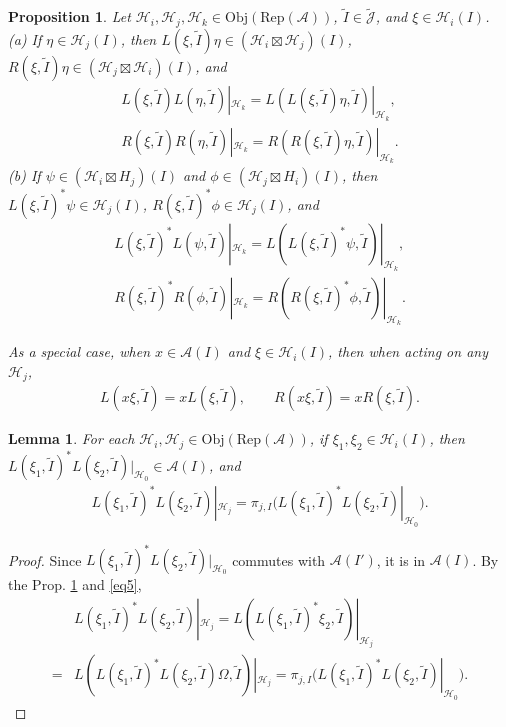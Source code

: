 \documentclass[12pt,a4paper,notitlepage]{article}
\theoremstyle{definition}
\theoremstyle{plain}
\newtheorem{pp}[df]{Proposition}
\newtheorem{lm}[df]{Lemma}
\newcommand{\mc}{\mathcal}
\newcommand{\wtd}{\widetilde}
\newcommand{\Jtd}{\widetilde{\mathcal J}}
\newcommand{\RepA}{\mathrm{Rep}(\mathcal A)}
\newcommand{\Obj}{\mathrm{Obj}}
\numberwithin{equation}{section}
\begin{document}
\begin{pp}\label{lb1}
Let $\mc H_i,\mc H_j,\mc H_k\in\Obj(\RepA)$, $\wtd I\in\Jtd$, and $\xi\in\mc H_i(I)$.\\
(a) If $\eta\in\mc H_j(I)$, then $L(\xi,\wtd I)\eta\in(\mc H_i\boxtimes\mc H_j)(I)$, $R(\xi,\wtd I)\eta\in(\mc H_j\boxtimes\mc H_i)(I)$, and
\begin{gather}
L(\xi,\wtd I)L(\eta,\wtd I)|_{\mc H_k}=L(L(\xi,\wtd I)\eta,\wtd I)|_{\mc H_k},\\
R(\xi,\wtd I)R(\eta,\wtd I)|_{\mc H_k}=R(R(\xi,\wtd I)\eta,\wtd I)|_{\mc H_k}.
\end{gather}
(b) If $\psi\in(\mc H_i\boxtimes H_j)(I)$ and $\phi\in (\mc H_j\boxtimes H_i)(I)$, then $L(\xi,\wtd I)^*\psi\in\mc H_j(I)$, $R(\xi,\wtd I)^*\phi\in\mc H_j(I)$, and
\begin{gather}
L(\xi,\wtd I)^*L(\psi,\wtd I)|_{\mc H_k}=L(L(\xi,\wtd I)^*\psi,\wtd I)|_{\mc H_k},\\
R(\xi,\wtd I)^*R(\phi,\wtd I)|_{\mc H_k}=R(R(\xi,\wtd I)^*\phi,\wtd I)|_{\mc H_k}.
\end{gather}

As a special case, when $x\in\mc A(I)$ and $\xi\in\mc H_i(I)$, then when acting on any $\mc H_j$,
\begin{align}
L(x\xi,\wtd I)=xL(\xi,\wtd I),\qquad R(x\xi,\wtd I)=xR(\xi,\wtd I).\label{eq11}	
\end{align}
\end{pp}

\begin{lm}\label{lb4}
For each $\mc H_i,\mc H_j\in\Obj(\RepA)$, if $\xi_1,\xi_2\in\mc H_i(I)$, then $L(\xi_1,\wtd I)^*L(\xi_2,\wtd I)|_{\mc H_0}\in\mc A(I)$, and
\begin{align}
L(\xi_1,\wtd I)^*L(\xi_2,\wtd I)|_{\mc H_j}=\pi_{j,I}\big(L(\xi_1,\wtd I)^*L(\xi_2,\wtd I)|_{\mc H_0}\big).	\label{eq8}
\end{align}
\end{lm}

\begin{proof}
Since $L(\xi_1,\wtd I)^*L(\xi_2,\wtd I)|_{\mc H_0}$ commutes with $\mc A(I')$, it  is in $\mc A(I)$. By the Prop. \ref{lb1} and \eqref{eq5}, 
\begin{align*}
&L(\xi_1,\wtd I)^*L(\xi_2,\wtd I)|_{\mc H_j}=L(L(\xi_1,\wtd I)^*\xi_2,\wtd I)|_{\mc H_j}\\	=&L(L(\xi_1,\wtd I)^*L(\xi_2,\wtd I)\Omega,\wtd I)|_{\mc H_j}=\pi_{j,I}\big(L(\xi_1,\wtd I)^*L(\xi_2,\wtd I)|_{\mc H_0}\big).	
\end{align*}
\end{proof}
\end{document}
